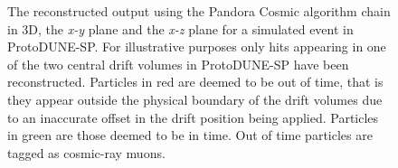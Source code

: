 \begin{figure}
\centering
{}
\caption{The reconstructed output using the Pandora Cosmic algorithm chain in \protect{} 3D, \protect{} the \textit{x-y} plane and \protect{} the \textit{x-z} plane for a simulated event in ProtoDUNE-SP.  For illustrative purposes only hits appearing in one of the two central drift volumes in ProtoDUNE-SP have been reconstructed.  Particles in red are deemed to be out of time, that is they appear outside the physical boundary of the drift volumes due to an inaccurate offset in the drift position being applied.  Particles in green are those deemed to be in time.  Out of time particles are tagged as cosmic-ray muons.}
\label{fig:intime}
\end{figure}


